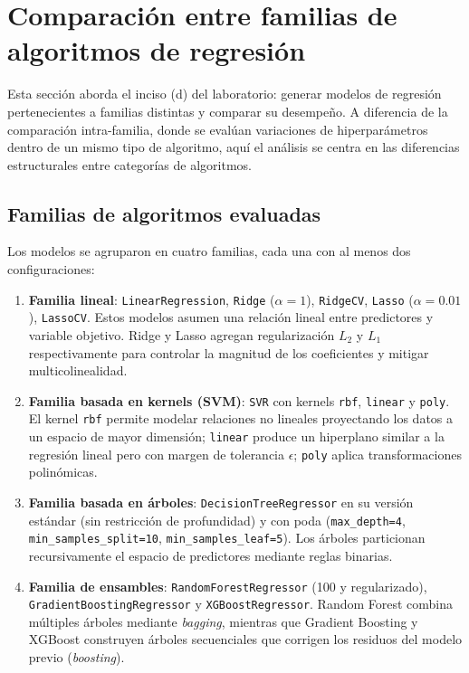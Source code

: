 \documentclass[12pt,letterpaper]{article}
\begin{document}
\section{Comparación entre familias de algoritmos de regresión}

Esta sección aborda el inciso (d) del laboratorio: generar modelos de regresión pertenecientes a familias distintas y comparar su desempeño. A diferencia de la comparación intra-familia, donde se evalúan variaciones de hiperparámetros dentro de un mismo tipo de algoritmo, aquí el análisis se centra en las diferencias estructurales entre categorías de algoritmos.

\subsection{Familias de algoritmos evaluadas}

Los modelos se agruparon en cuatro familias, cada una con al menos dos configuraciones:

\begin{enumerate}
    \item \textbf{Familia lineal}: \texttt{LinearRegression}, \texttt{Ridge} ($\alpha=1$), \texttt{RidgeCV}, \texttt{Lasso} ($\alpha=0.01$), \texttt{LassoCV}. Estos modelos asumen una relación lineal entre predictores y variable objetivo. Ridge y Lasso agregan regularización $L_2$ y $L_1$ respectivamente para controlar la magnitud de los coeficientes y mitigar multicolinealidad.
    \item \textbf{Familia basada en kernels (SVM)}: \texttt{SVR} con kernels \texttt{rbf}, \texttt{linear} y \texttt{poly}. El kernel \texttt{rbf} permite modelar relaciones no lineales proyectando los datos a un espacio de mayor dimensión; \texttt{linear} produce un hiperplano similar a la regresión lineal pero con margen de tolerancia $\epsilon$; \texttt{poly} aplica transformaciones polinómicas.
    \item \textbf{Familia basada en árboles}: \texttt{DecisionTreeRegressor} en su versión estándar (sin restricción de profundidad) y con poda (\texttt{max\_depth=4}, \texttt{min\_samples\_split=10}, \texttt{min\_samples\_leaf=5}). Los árboles particionan recursivamente el espacio de predictores mediante reglas binarias.
    \item \textbf{Familia de ensambles}: \texttt{RandomForestRegressor} (100 y regularizado), \texttt{GradientBoostingRegressor} y \texttt{XGBoostRegressor}. Random Forest combina múltiples árboles mediante \textit{bagging}, mientras que Gradient Boosting y XGBoost construyen árboles secuenciales que corrigen los residuos del modelo previo (\textit{boosting}).
\end{enumerate}
\end{document}
